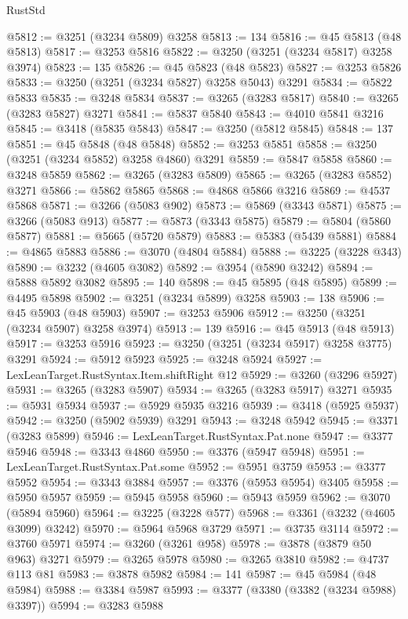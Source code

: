 \begin{lexlean}{RustStd}
\begin{coremodule}
@5812 := @3251 (@3234 @5809) @3258
@5813 := 134
@5816 := @45 @5813 (@48 @5813)
@5817 := @3253 @5816
@5822 := @3250 (@3251 (@3234 @5817) @3258 @3974)
@5823 := 135
@5826 := @45 @5823 (@48 @5823)
@5827 := @3253 @5826
@5833 := @3250 (@3251 (@3234 @5827) @3258 @5043) @3291
@5834 := @5822 @5833
@5835 := @3248 @5834
@5837 := @3265 (@3283 @5817)
@5840 := @3265 (@3283 @5827) @3271
@5841 := @5837 @5840
@5843 := @4010 @5841 @3216
@5845 := @3418 (@5835 @5843)
@5847 := @3250 (@5812 @5845)
@5848 := 137
@5851 := @45 @5848 (@48 @5848)
@5852 := @3253 @5851
@5858 := @3250 (@3251 (@3234 @5852) @3258 @4860) @3291
@5859 := @5847 @5858
@5860 := @3248 @5859
@5862 := @3265 (@3283 @5809)
@5865 := @3265 (@3283 @5852) @3271
@5866 := @5862 @5865
@5868 := @4868 @5866 @3216
@5869 := @4537 @5868
@5871 := @3266 (@5083 @902)
@5873 := @5869 (@3343 @5871)
@5875 := @3266 (@5083 @913)
@5877 := @5873 (@3343 @5875)
@5879 := @5804 (@5860 @5877)
@5881 := @5665 (@5720 @5879)
@5883 := @5383 (@5439 @5881)
@5884 := @4865 @5883
@5886 := @3070 (@4804 @5884)
@5888 := @3225 (@3228 @343)
@5890 := @3232 (@4605 @3082)
@5892 := @3954 (@5890 @3242)
@5894 := @5888 @5892 @3082
@5895 := 140
@5898 := @45 @5895 (@48 @5895)
@5899 := @4495 @5898
@5902 := @3251 (@3234 @5899) @3258
@5903 := 138
@5906 := @45 @5903 (@48 @5903)
@5907 := @3253 @5906
@5912 := @3250 (@3251 (@3234 @5907) @3258 @3974)
@5913 := 139
@5916 := @45 @5913 (@48 @5913)
@5917 := @3253 @5916
@5923 := @3250 (@3251 (@3234 @5917) @3258 @3775) @3291
@5924 := @5912 @5923
@5925 := @3248 @5924
@5927 := LexLeanTarget.RustSyntax.Item.shiftRight @12
@5929 := @3260 (@3296 @5927)
@5931 := @3265 (@3283 @5907)
@5934 := @3265 (@3283 @5917) @3271
@5935 := @5931 @5934
@5937 := @5929 @5935 @3216
@5939 := @3418 (@5925 @5937)
@5942 := @3250 (@5902 @5939) @3291
@5943 := @3248 @5942
@5945 := @3371 (@3283 @5899)
@5946 := LexLeanTarget.RustSyntax.Pat.none
@5947 := @3377 @5946
@5948 := @3343 @4860
@5950 := @3376 (@5947 @5948)
@5951 := LexLeanTarget.RustSyntax.Pat.some
@5952 := @5951 @3759
@5953 := @3377 @5952
@5954 := @3343 @3884
@5957 := @3376 (@5953 @5954) @3405
@5958 := @5950 @5957
@5959 := @5945 @5958
@5960 := @5943 @5959
@5962 := @3070 (@5894 @5960)
@5964 := @3225 (@3228 @577)
@5968 := @3361 (@3232 (@4605 @3099) @3242)
@5970 := @5964 @5968 @3729
@5971 := @3735 @3114
@5972 := @3760 @5971
@5974 := @3260 (@3261 @958)
@5978 := @3878 (@3879 @50 @963) @3271
@5979 := @3265 @5978
@5980 := @3265 @3810
@5982 := @4737 @113 @81
@5983 := @3878 @5982
@5984 := 141
@5987 := @45 @5984 (@48 @5984)
@5988 := @3384 @5987
@5993 := @3377 (@3380 (@3382 (@3234 @5988) @3397))
@5994 := @3283 @5988

\end{coremodule}
\end{lexlean}
